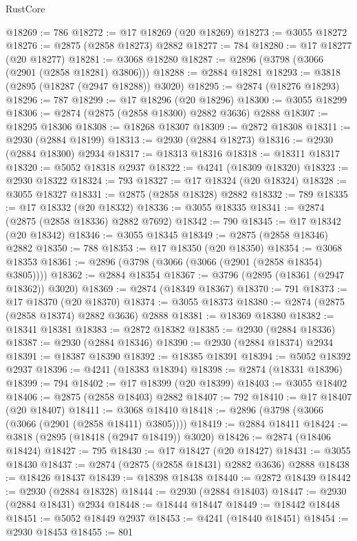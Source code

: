 \begin{lexlean}{RustCore}
\begin{coremodule}
@18269 := 786
@18272 := @17 @18269 (@20 @18269)
@18273 := @3055 @18272
@18276 := @2875 (@2858 @18273) @2882
@18277 := 784
@18280 := @17 @18277 (@20 @18277)
@18281 := @3068 @18280
@18287 := @2896 (@3798 (@3066 (@2901 (@2858 @18281) @3806)))
@18288 := @2884 @18281
@18293 := @3818 (@2895 (@18287 (@2947 @18288)) @3020)
@18295 := @2874 (@18276 @18293)
@18296 := 787
@18299 := @17 @18296 (@20 @18296)
@18300 := @3055 @18299
@18306 := @2874 (@2875 (@2858 @18300) @2882 @3636) @2888
@18307 := @18295 @18306
@18308 := @18268 @18307
@18309 := @2872 @18308
@18311 := @2930 (@2884 @18199)
@18313 := @2930 (@2884 @18273)
@18316 := @2930 (@2884 @18300) @2934
@18317 := @18313 @18316
@18318 := @18311 @18317
@18320 := @5052 @18318 @2937
@18322 := @4241 (@18309 @18320)
@18323 := @2930 @18322
@18324 := 793
@18327 := @17 @18324 (@20 @18324)
@18328 := @3055 @18327
@18331 := @2875 (@2858 @18328) @2882
@18332 := 789
@18335 := @17 @18332 (@20 @18332)
@18336 := @3055 @18335
@18341 := @2874 (@2875 (@2858 @18336) @2882 @7692)
@18342 := 790
@18345 := @17 @18342 (@20 @18342)
@18346 := @3055 @18345
@18349 := @2875 (@2858 @18346) @2882
@18350 := 788
@18353 := @17 @18350 (@20 @18350)
@18354 := @3068 @18353
@18361 := @2896 (@3798 (@3066 (@3066 (@2901 (@2858 @18354) @3805))))
@18362 := @2884 @18354
@18367 := @3796 (@2895 (@18361 (@2947 @18362)) @3020)
@18369 := @2874 (@18349 @18367)
@18370 := 791
@18373 := @17 @18370 (@20 @18370)
@18374 := @3055 @18373
@18380 := @2874 (@2875 (@2858 @18374) @2882 @3636) @2888
@18381 := @18369 @18380
@18382 := @18341 @18381
@18383 := @2872 @18382
@18385 := @2930 (@2884 @18336)
@18387 := @2930 (@2884 @18346)
@18390 := @2930 (@2884 @18374) @2934
@18391 := @18387 @18390
@18392 := @18385 @18391
@18394 := @5052 @18392 @2937
@18396 := @4241 (@18383 @18394)
@18398 := @2874 (@18331 @18396)
@18399 := 794
@18402 := @17 @18399 (@20 @18399)
@18403 := @3055 @18402
@18406 := @2875 (@2858 @18403) @2882
@18407 := 792
@18410 := @17 @18407 (@20 @18407)
@18411 := @3068 @18410
@18418 := @2896 (@3798 (@3066 (@3066 (@2901 (@2858 @18411) @3805))))
@18419 := @2884 @18411
@18424 := @3818 (@2895 (@18418 (@2947 @18419)) @3020)
@18426 := @2874 (@18406 @18424)
@18427 := 795
@18430 := @17 @18427 (@20 @18427)
@18431 := @3055 @18430
@18437 := @2874 (@2875 (@2858 @18431) @2882 @3636) @2888
@18438 := @18426 @18437
@18439 := @18398 @18438
@18440 := @2872 @18439
@18442 := @2930 (@2884 @18328)
@18444 := @2930 (@2884 @18403)
@18447 := @2930 (@2884 @18431) @2934
@18448 := @18444 @18447
@18449 := @18442 @18448
@18451 := @5052 @18449 @2937
@18453 := @4241 (@18440 @18451)
@18454 := @2930 @18453
@18455 := 801

\end{coremodule}
\end{lexlean}
